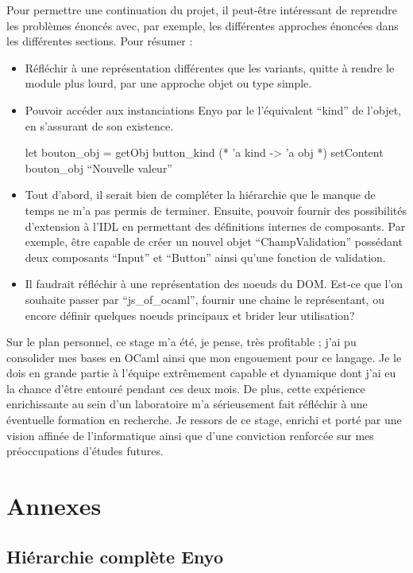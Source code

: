 \documentclass[11pt,a4paper]{report}
\begin{document}
Pour permettre une continuation du projet, il peut-être intéressant de reprendre les problèmes
énoncés avec, par exemple, les différentes approches énoncées dans les différentes sections. Pour résumer :
\begin{itemize}
\item Réfléchir à une représentation différentes que les variants, quitte à rendre le
  module plus lourd, par une approche objet ou type simple.
\item Pouvoir accéder aux instanciations Enyo par le l'équivalent ``kind'' de l'objet, en s'assurant
  de son existence.
  \begin{OCaml}
    let bouton_obj = getObj button_kind (* 'a kind -> 'a obj *)
    setContent bouton_obj ``Nouvelle valeur''
  \end{OCaml}
\item Tout d'abord, il serait bien de compléter la hiérarchie que le manque de temps ne m'a pas permis de terminer.
  Ensuite, pouvoir fournir des possibilités d'extension à l'IDL en permettant des définitions internes 
  de composants. Par exemple, être capable  de créer un nouvel objet ``ChampValidation'' possédant 
  deux composants ``Input'' et ``Button'' ainsi qu'une fonction de validation.
\item Il faudrait réfléchir à une représentation des noeuds du DOM. Est-ce que l'on souhaite passer 
  par ``js\_of\_ocaml'', fournir une chaine le représentant, ou encore définir quelques noeuds principaux
  et brider leur utilisation?
\end{itemize}\medskip

Sur le plan personnel, ce stage m'a été, je pense, très profitable ; j'ai pu consolider mes bases en OCaml
ainsi que mon engouement pour ce langage. Je le dois en grande partie à l'équipe extrêmement capable et dynamique
dont j'ai eu la chance d'être entouré pendant ces deux mois. 
De plus, cette expérience enrichissante au sein d'un laboratoire m'a sérieusement fait réfléchir à 
une éventuelle formation en recherche.
Je ressors de ce stage, enrichi et porté par une vision affinée de l'informatique ainsi que d'une 
conviction renforcée sur mes préoccupations d'études futures.

\chapter{Annexes}

\section{Hiérarchie complète Enyo}\label{hier-complet}
\end{document}
